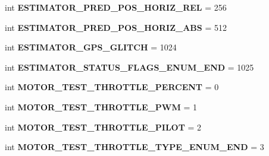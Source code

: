 \begin{DoxyCompactItemize}
int {\bfseries E\+S\+T\+I\+M\+A\+T\+O\+R\+\_\+\+P\+R\+E\+D\+\_\+\+P\+O\+S\+\_\+\+H\+O\+R\+I\+Z\+\_\+\+R\+EL} = 256
\item 
\mbox{\label{namespacepymavlink_1_1dialects_1_1v10_a2caf917bb8c7eb8f2d49fb9d92d33a1b}} 
int {\bfseries E\+S\+T\+I\+M\+A\+T\+O\+R\+\_\+\+P\+R\+E\+D\+\_\+\+P\+O\+S\+\_\+\+H\+O\+R\+I\+Z\+\_\+\+A\+BS} = 512
\item 
\mbox{\label{namespacepymavlink_1_1dialects_1_1v10_acad12e6f3f0c7bed1889312a44a6146f}} 
int {\bfseries E\+S\+T\+I\+M\+A\+T\+O\+R\+\_\+\+G\+P\+S\+\_\+\+G\+L\+I\+T\+CH} = 1024
\item 
\mbox{\label{namespacepymavlink_1_1dialects_1_1v10_a8d32f19e2383fddbc7907221ac829594}} 
int {\bfseries E\+S\+T\+I\+M\+A\+T\+O\+R\+\_\+\+S\+T\+A\+T\+U\+S\+\_\+\+F\+L\+A\+G\+S\+\_\+\+E\+N\+U\+M\+\_\+\+E\+ND} = 1025
\item 
\mbox{\label{namespacepymavlink_1_1dialects_1_1v10_a87f1598580ab3762d9b98942c2224e1f}} 
int {\bfseries M\+O\+T\+O\+R\+\_\+\+T\+E\+S\+T\+\_\+\+T\+H\+R\+O\+T\+T\+L\+E\+\_\+\+P\+E\+R\+C\+E\+NT} = 0
\item 
\mbox{\label{namespacepymavlink_1_1dialects_1_1v10_a986e11544a39bbeae205d07805dd2264}} 
int {\bfseries M\+O\+T\+O\+R\+\_\+\+T\+E\+S\+T\+\_\+\+T\+H\+R\+O\+T\+T\+L\+E\+\_\+\+P\+WM} = 1
\item 
\mbox{\label{namespacepymavlink_1_1dialects_1_1v10_ae8cf5fe7839b2587a7544d4e9cdcca13}} 
int {\bfseries M\+O\+T\+O\+R\+\_\+\+T\+E\+S\+T\+\_\+\+T\+H\+R\+O\+T\+T\+L\+E\+\_\+\+P\+I\+L\+OT} = 2
\item 
\mbox{\label{namespacepymavlink_1_1dialects_1_1v10_a808ec6563fffb30d8469f6cfd120ce18}} 
int {\bfseries M\+O\+T\+O\+R\+\_\+\+T\+E\+S\+T\+\_\+\+T\+H\+R\+O\+T\+T\+L\+E\+\_\+\+T\+Y\+P\+E\+\_\+\+E\+N\+U\+M\+\_\+\+E\+ND} = 3
\item 
\mbox{\label{namespacepymavlink_1_1dialects_1_1v10_a7b2bb6386902adbe0e449d3c52c6ae1c}} 

\end{DoxyCompactItemize}
